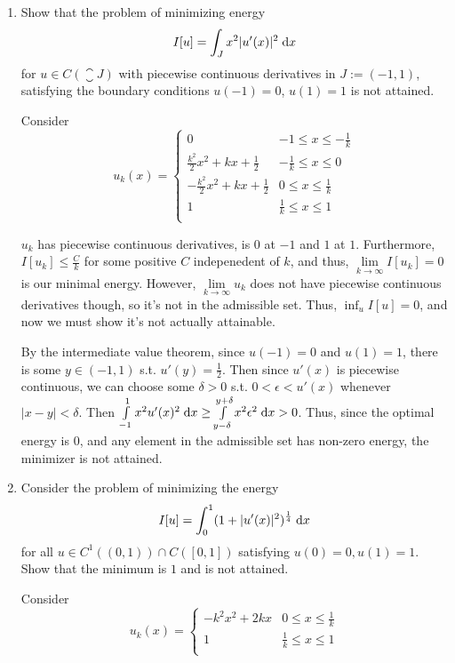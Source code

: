 \begin{enumerate}
\item
  Show that the problem of minimizing energy
  $$
  I[u] = \int_J x^2 |u'(x)|^2 \;\mathrm{d}x
  $$
  for $u \in C(\closure{J})$ with piecewise continuous derivatives in $J := (-1, 1)$,
  satisfying the boundary conditions $u(-1) = 0$, $u(1) = 1$ is not attained.

  Consider
  $$
  u_k(x) =
  \begin{cases}
    0 & -1 \leq x \leq -\frac{1}{k}\\
    \frac{k^2}{2} x^2 + k x + \frac{1}{2} & -\frac{1}{k} \leq x \leq 0\\
    -\frac{k^2}{2} x^2 + k x + \frac{1}{2} & 0 \leq x \leq \frac{1}{k}\\
    1 & \frac{1}{k} \leq x \leq 1\\
  \end{cases}
  $$

  $u_k$ has piecewise continuous derivatives, is $0$ at $-1$ and $1$ at $1$.
  Furthermore, $I[u_k] \leq \frac{C}{k}$ for some positive $C$ indepenedent of $k$,
  and thus, $\lim \limits_{k \rightarrow \infty} I[u_k] = 0$ is our minimal energy.
  However, $\lim \limits_{k \rightarrow \infty} u_k$ does not have piecewise continuous derivatives though, so it's not in the admissible set.
  Thus, $\inf_{u} I[u] = 0$, and now we must show it's not actually attainable.

  By the intermediate value theorem, since $u(-1) = 0$ and $u(1) = 1$, there is some $y \in (-1, 1)$ s.t. $u'(y) = \frac{1}{2}$.
  Then since $u'(x)$ is piecewise continuous, we can choose some $\delta > 0$ s.t. $0 < \epsilon < u'(x)$ whenever $|x - y| < \delta$.
  Then $\int \limits_{-1}^{1} x^2 u'(x)^2 \;\mathrm{d}x \geq \int \limits_{y - \delta}^{y + \delta} x^2 \epsilon^2 \;\mathrm{d}x > 0$.
  Thus, since the optimal energy is $0$, and any element in the admissible set has non-zero energy, the minimizer is not attained.

\item
  Consider the problem of minimizing the energy
  $$
  I[u] = \int_0^1 (1 + |u'(x)|^2)^{\frac{1}{4}} \;\mathrm{d}x
  $$
  for all $u \in C^1((0, 1)) \cap C([0, 1])$ satisfying $u(0) = 0, u(1) = 1$. Show that the minimum is $1$ and is not attained.

  Consider
  $$
  u_k(x) =
  \begin{cases}
    -k^2 x^2 + 2 k x & 0 \leq x \leq \frac{1}{k}\\
    1 & \frac{1}{k} \leq x \leq 1\\
  \end{cases}
  $$


\end{enumerate}
